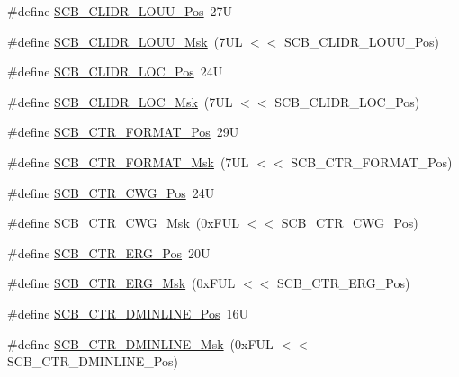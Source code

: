 \begin{DoxyCompactItemize}
\item 
\#define \mbox{\hyperlink{group___c_m_s_i_s___s_c_b_ga384f04641b96d74495e023cca27ed72f}{S\+C\+B\+\_\+\+C\+L\+I\+D\+R\+\_\+\+L\+O\+U\+U\+\_\+\+Pos}}~27U
\item 
\#define \mbox{\hyperlink{group___c_m_s_i_s___s_c_b_ga4a2124def29e03f85d8ab6b455f5a174}{S\+C\+B\+\_\+\+C\+L\+I\+D\+R\+\_\+\+L\+O\+U\+U\+\_\+\+Msk}}~(7\+U\+L $<$$<$ S\+C\+B\+\_\+\+C\+L\+I\+D\+R\+\_\+\+L\+O\+U\+U\+\_\+\+Pos)
\item 
\#define \mbox{\hyperlink{group___c_m_s_i_s___s_c_b_gad723f01984bb639c77acc9529fa35ea8}{S\+C\+B\+\_\+\+C\+L\+I\+D\+R\+\_\+\+L\+O\+C\+\_\+\+Pos}}~24U
\item 
\#define \mbox{\hyperlink{group___c_m_s_i_s___s_c_b_ga3accaa1c94b1d7b920a48ffa1b47443b}{S\+C\+B\+\_\+\+C\+L\+I\+D\+R\+\_\+\+L\+O\+C\+\_\+\+Msk}}~(7\+U\+L $<$$<$ S\+C\+B\+\_\+\+C\+L\+I\+D\+R\+\_\+\+L\+O\+C\+\_\+\+Pos)
\item 
\#define \mbox{\hyperlink{group___c_m_s_i_s___s_c_b_gab3c7f12bf78e1049eeb477a1d48b144f}{S\+C\+B\+\_\+\+C\+T\+R\+\_\+\+F\+O\+R\+M\+A\+T\+\_\+\+Pos}}~29U
\item 
\#define \mbox{\hyperlink{group___c_m_s_i_s___s_c_b_gaf0303349e35d3777aa3aceae268f1651}{S\+C\+B\+\_\+\+C\+T\+R\+\_\+\+F\+O\+R\+M\+A\+T\+\_\+\+Msk}}~(7\+U\+L $<$$<$ S\+C\+B\+\_\+\+C\+T\+R\+\_\+\+F\+O\+R\+M\+A\+T\+\_\+\+Pos)
\item 
\#define \mbox{\hyperlink{group___c_m_s_i_s___s_c_b_ga96ba2dac3d22d7892eabb851c052a286}{S\+C\+B\+\_\+\+C\+T\+R\+\_\+\+C\+W\+G\+\_\+\+Pos}}~24U
\item 
\#define \mbox{\hyperlink{group___c_m_s_i_s___s_c_b_ga341c1fe0efc63e26a2affebda136da6c}{S\+C\+B\+\_\+\+C\+T\+R\+\_\+\+C\+W\+G\+\_\+\+Msk}}~(0x\+F\+U\+L $<$$<$ S\+C\+B\+\_\+\+C\+T\+R\+\_\+\+C\+W\+G\+\_\+\+Pos)
\item 
\#define \mbox{\hyperlink{group___c_m_s_i_s___s_c_b_ga7692042fbaab5852ca60f6c2d659f724}{S\+C\+B\+\_\+\+C\+T\+R\+\_\+\+E\+R\+G\+\_\+\+Pos}}~20U
\item 
\#define \mbox{\hyperlink{group___c_m_s_i_s___s_c_b_ga02bb1ed5199a32e0ebad001e1b64ac35}{S\+C\+B\+\_\+\+C\+T\+R\+\_\+\+E\+R\+G\+\_\+\+Msk}}~(0x\+F\+U\+L $<$$<$ S\+C\+B\+\_\+\+C\+T\+R\+\_\+\+E\+R\+G\+\_\+\+Pos)
\item 
\#define \mbox{\hyperlink{group___c_m_s_i_s___s_c_b_gae25b69e6ea66c125f703870adabb0d65}{S\+C\+B\+\_\+\+C\+T\+R\+\_\+\+D\+M\+I\+N\+L\+I\+N\+E\+\_\+\+Pos}}~16U
\item 
\#define \mbox{\hyperlink{group___c_m_s_i_s___s_c_b_ga634bb0b270954a68757c86c517de948b}{S\+C\+B\+\_\+\+C\+T\+R\+\_\+\+D\+M\+I\+N\+L\+I\+N\+E\+\_\+\+Msk}}~(0x\+F\+U\+L $<$$<$ S\+C\+B\+\_\+\+C\+T\+R\+\_\+\+D\+M\+I\+N\+L\+I\+N\+E\+\_\+\+Pos)

\end{DoxyCompactItemize}
